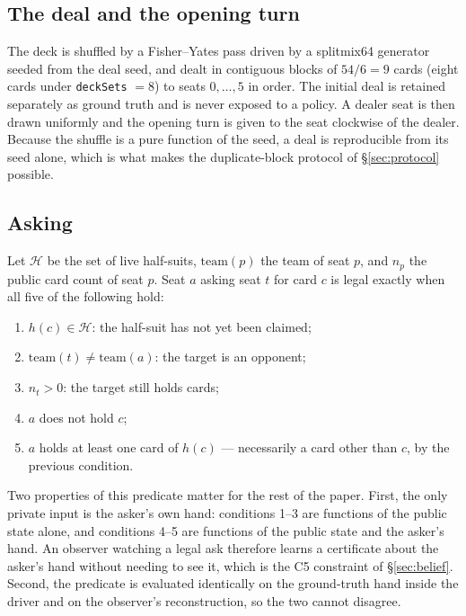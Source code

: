 \subsection{The deal and the opening turn}

The deck is shuffled by a Fisher--Yates pass driven by a splitmix64 generator
seeded from the deal seed, and dealt in contiguous blocks of $54/6 = 9$ cards
(eight cards under \texttt{deckSets} $=8$) to seats $0,\dots,5$ in order. The
initial deal is retained separately as ground truth and is never exposed to a
policy. A dealer seat is then drawn uniformly and the opening turn is given to
the seat clockwise of the dealer. Because the shuffle is a pure function of the
seed, a deal is reproducible from its seed alone, which is what makes the
duplicate-block protocol of \S\ref{sec:protocol} possible.

\subsection{Asking}
\label{app:dialect-ask}

Let $\mathcal{H}$ be the set of live half-suits, $\mathrm{team}(p)$ the team of
seat $p$, and $n_p$ the public card count of seat $p$. Seat $a$ asking seat $t$
for card $c$ is legal exactly when all five of the following hold:

\begin{enumerate}
  \item $h(c) \in \mathcal{H}$: the half-suit has not yet been claimed;
  \item $\mathrm{team}(t) \neq \mathrm{team}(a)$: the target is an opponent;
  \item $n_t > 0$: the target still holds cards;
  \item $a$ does not hold $c$;
  \item $a$ holds at least one card of $h(c)$ --- necessarily a card other than
        $c$, by the previous condition.
\end{enumerate}

Two properties of this predicate matter for the rest of the paper. First, the
only private input is the asker's own hand: conditions 1--3 are functions of the
public state alone, and conditions 4--5 are functions of the public state and
the asker's hand. An observer watching a legal ask therefore learns a certificate
about the asker's hand without needing to see it, which is the C5 constraint of
\S\ref{sec:belief}. Second, the predicate is evaluated identically on the
ground-truth hand inside the driver and on the observer's reconstruction, so the
two cannot disagree.

